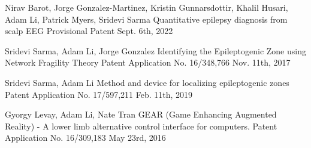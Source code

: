 
\vspace{-.5cm}
\begin{cventries}

    \cvpresentation
    {Nirav Barot, Jorge Gonzalez-Martinez, Kristin Gunnarsdottir, Khalil Husari, Adam Li, Patrick Myers, Sridevi Sarma} %
    {Quantitative epilepsy diagnosis from scalp EEG} %
    {Provisional Patent} %
    {Sept. 6th, 2022} %
    {\empty}
    {\empty}
    \vspace{-1.0cm}
    
    \cvpresentation
    {Sridevi Sarma, Adam Li, Jorge Gonzalez} %
    {Identifying the Epileptogenic Zone using Network Fragility Theory} %
    {Patent Application No. 16/348,766} %
    {Nov. 11th, 2017} %
    {\empty}
    {\empty}
    \vspace{-1.0cm}
    
    \cvpresentation
    {Sridevi Sarma, Adam Li} %
    {Method and device for localizing epileptogenic zones} %
    {Patent Application No. 17/597,211} %
    {Feb. 11th, 2019} %
    {\empty}
    {\empty}
    \vspace{-1.0cm}
    
    \cvpresentation
    {Gyorgy Levay, Adam Li, Nate Tran} %
    {GEAR (Game Enhancing Augmented Reality) - A lower limb alternative control interface for computers. } %
    {Patent Application No. 16/309,183} %
    {May 23rd, 2016} %
    {\empty}
    {\empty}
    \vspace{-1.0cm}
    
\end{cventries}